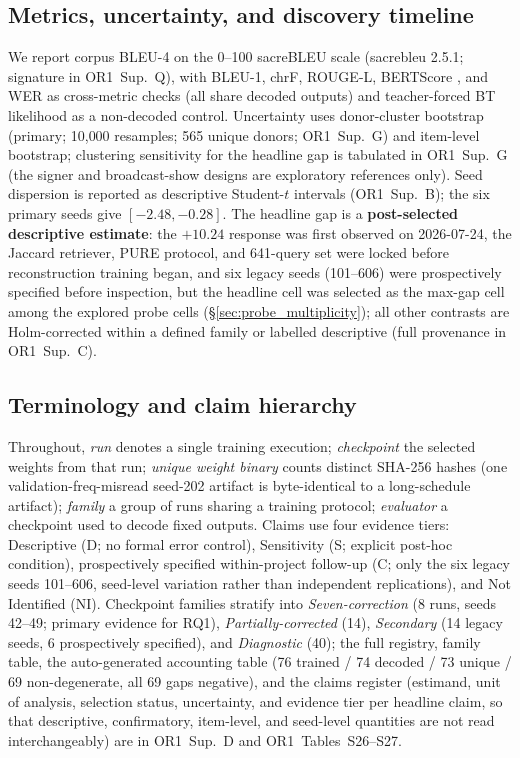 \documentclass[pdflatex,sn-chicago]{sn-jnl}
\begin{document}
\subsection{Metrics, uncertainty, and discovery timeline}
\label{sec:discovery}
We report corpus BLEU-4 on the 0--100 sacreBLEU scale \cite{post2018sacrebleu} (sacrebleu 2.5.1; signature in OR1~Sup.~Q), with BLEU-1, chrF, ROUGE-L, BERTScore \cite{zhang2020bertscore}, and WER as cross-metric checks (all share decoded outputs) and teacher-forced BT likelihood as a non-decoded control. Uncertainty uses donor-cluster bootstrap (primary; 10{,}000 resamples; 565 unique donors; OR1~Sup.~G) and item-level bootstrap; clustering sensitivity for the headline gap is tabulated in OR1~Sup.~G (the signer and broadcast-show designs are exploratory references only). Seed dispersion is reported as descriptive Student-$t$ intervals (OR1~Sup.~B); the six primary seeds give $[-2.48,-0.28]$. The headline gap is a \textbf{post-selected descriptive estimate}: the $+10.24$ response was first observed on 2026-07-24, the Jaccard retriever, PURE protocol, and 641-query set were locked before reconstruction training began, and six legacy seeds (101--606) were prospectively specified before inspection, but the headline cell was selected as the max-gap cell among the explored probe cells (\S\ref{sec:probe_multiplicity}); all other contrasts are Holm-corrected within a defined family or labelled descriptive (full provenance in OR1~Sup.~C).

\subsection{Terminology and claim hierarchy}
\label{sec:stratification}
Throughout, \emph{run} denotes a single training execution; \emph{checkpoint} the selected weights from that run; \emph{unique weight binary} counts distinct SHA-256 hashes (one validation-freq-misread seed-202 artifact is byte-identical to a long-schedule artifact); \emph{family} a group of runs sharing a training protocol; \emph{evaluator} a checkpoint used to decode fixed outputs. Claims use four evidence tiers: Descriptive (D; no formal error control), Sensitivity (S; explicit post-hoc condition), prospectively specified within-project follow-up (C; only the six legacy seeds 101--606, seed-level variation rather than independent replications), and Not Identified (NI). Checkpoint families stratify into \emph{Seven-correction} (8 runs, seeds 42--49; primary evidence for RQ1), \emph{Partially-corrected} (14), \emph{Secondary} (14 legacy seeds, 6 prospectively specified), and \emph{Diagnostic} (40); the full registry, family table, the auto-generated accounting table (76 trained / 74 decoded / 73 unique / 69 non-degenerate, all 69 gaps negative), and the claims register (estimand, unit of analysis, selection status, uncertainty, and evidence tier per headline claim, so that descriptive, confirmatory, item-level, and seed-level quantities are not read interchangeably) are in OR1~Sup.~D and OR1~Tables~S26--S27.
\end{document}
